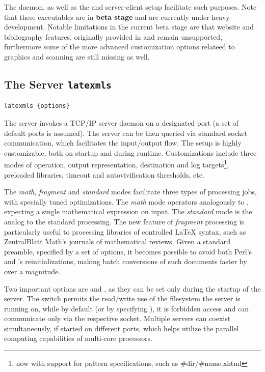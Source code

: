 \documentclass{book}
\begin{document}
The  daemon, as well as the  and 
server-client setup facilitate such purposes. Note that these executables are in
\textbf{beta stage} and are currently under heavy development. Notable limitations in the
current beta stage are that website and bibliography features, originally provided in
 and  remain unsupported, furthermore some of the more
advanced customization options relateed to graphics and scanning are still missing as
well.

\subsection{The {\LaTeXML} Server \texttt{latexmls}}

\begin{lstlisting}[style=shell]
  latexmls {options}
\end{lstlisting}

The  server invokes a TCP/IP server daemon on a designated port (a set of default ports is assumed). The server can be then queried via standard socket communication, which facilitates the input/output flow. The setup is highly customizable, both on startup and during runtime. Customizations include three modes of operation, output representation, destination and log targets\footnote{now with support for pattern specifications, such as \#dir/\#name.xhtml}, preloaded libraries, timeout and autovivification thresholds, etc. 


The \textit{math}, \textit{fragment} and \textit{standard} modes facilitate three types of processing jobs, with specially tuned optimizations. The \textit{math} mode operators analogously to , expecting a single mathematical expression on input. The \textit{standard} mode is the analog to the standard  processing. The new feature of \textit{fragment} processing is particularly useful to processing libraries of controlled {\LaTeX} syntax, such as ZentralBlatt Math's journals of mathematical reviews. Given a standard preamble, specified by a set of  options, it becomes possible to avoid both Perl's and {\LaTeXML}'s reinitializations, making batch conversions of such documents faster by over a magnitude.


Two important options are  and , as they can be set only during the startup of the server. The  switch permits the read/write use of the filesystem the server is running on, while by default (or by specifying ), it is forbidden access and can communicate only via the respective socket. Multiple {\LaTeXML} servers can coexist simultaneously, if started on different ports, which helps utilize the parallel computing capabilities of multi-core processors.
\end{document}
